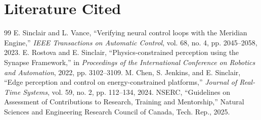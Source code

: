 \section{Literature Cited}
\begin{thebibliography}{99}
 E. Sinclair and L. Vance, ``Verifying neural control loops with the Meridian Engine,'' \emph{IEEE Transactions on Automatic Control}, vol. 68, no. 4, pp. 2045--2058, 2023.
 E. Rostova and E. Sinclair, ``Physics-constrained perception using the Synapse Framework,'' in \emph{Proceedings of the International Conference on Robotics and Automation}, 2022, pp. 3102--3109.
 M. Chen, S. Jenkins, and E. Sinclair, ``Edge perception and control on energy-constrained platforms,'' \emph{Journal of Real-Time Systems}, vol. 59, no. 2, pp. 112--134, 2024.
 NSERC, ``Guidelines on Assessment of Contributions to Research, Training and Mentorship,'' Natural Sciences and Engineering Research Council of Canada, Tech. Rep., 2025.
\end{thebibliography}
